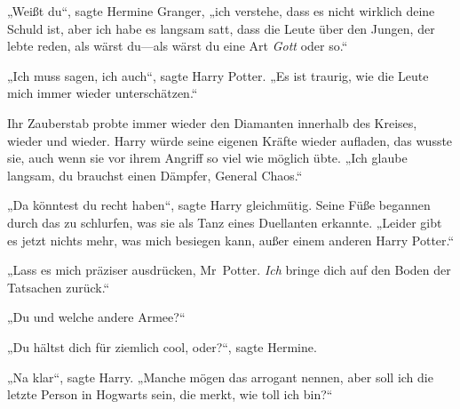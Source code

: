 „Weißt du“, sagte Hermine Granger, „ich verstehe, dass es nicht wirklich deine Schuld ist, aber ich habe es langsam satt, dass die Leute über den Jungen, der lebte reden, als wärst du—als wärst du eine Art \emph{Gott} oder so.“

„Ich muss sagen, ich auch“, sagte Harry Potter. „Es ist traurig, wie die Leute mich immer wieder unterschätzen.“

Ihr Zauberstab probte immer wieder den Diamanten innerhalb des Kreises, wieder und wieder. Harry würde seine eigenen Kräfte wieder aufladen, das wusste sie, auch wenn sie vor ihrem Angriff so viel wie möglich übte. „Ich glaube langsam, du brauchst einen Dämpfer, General Chaos.“

„Da könntest du recht haben“, sagte Harry gleichmütig. Seine Füße begannen durch das zu schlurfen, was sie als Tanz eines Duellanten erkannte. „Leider gibt es jetzt nichts mehr, was mich besiegen kann, außer einem anderen Harry Potter.“

„Lass es mich präziser ausdrücken, Mr~Potter. \emph{Ich} bringe dich auf den Boden der Tatsachen zurück.“

„Du und welche andere Armee?“

„Du hältst dich für ziemlich cool, oder?“, sagte Hermine.

„Na klar“, sagte Harry. „Manche mögen das arrogant nennen, aber soll ich die letzte Person in Hogwarts sein, die merkt, wie toll ich bin?“

